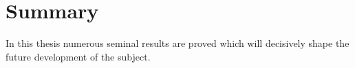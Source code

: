 \chapter*{Summary} %
In this thesis numerous seminal results are proved which will
decisively shape the future development of the subject.
